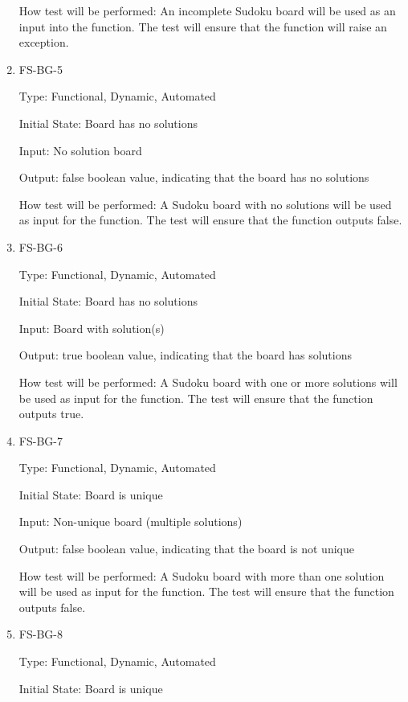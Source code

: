 \documentclass[11pt]{article}
\begin{document}
\begin{enumerate}
How test will be performed: An incomplete Sudoku board will be used as an input into the function. The test will ensure that the function will raise an exception.

\item{FS-BG-5\\}

Type: Functional, Dynamic, Automated
					
Initial State: Board has no solutions
					
Input: No solution board
					
Output: false boolean value, indicating that the board has no solutions
					
How test will be performed: A Sudoku board with no solutions will be used as input for the function. The test will ensure that the function outputs false.

\item{FS-BG-6\\}

Type: Functional, Dynamic, Automated
					
Initial State: Board has no solutions
					
Input: Board with solution(s)
					
Output: true boolean value, indicating that the board has solutions
					
How test will be performed: A Sudoku board with one or more solutions will be used as input for the function. The test will ensure that the function outputs true.

\item{FS-BG-7\\}

Type: Functional, Dynamic, Automated
					
Initial State: Board is unique
					
Input: Non-unique board (multiple solutions)
					
Output: false boolean value, indicating that the board is not unique
					
How test will be performed: A Sudoku board with more than one solution will be used as input for the function. The test will ensure that the function outputs false.

\item{FS-BG-8\\}

Type: Functional, Dynamic, Automated
					
Initial State: Board is unique
					

\end{enumerate}
\end{document}
